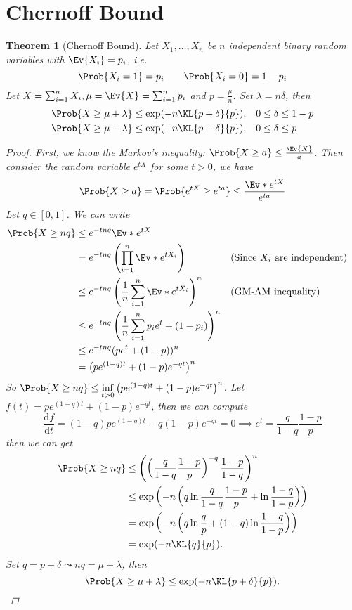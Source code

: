 \documentclass[a4paper]{article}
\theoremstyle{mystyle}
\newtheorem{theorem}{Theorem}
\begin{document}
\section{Chernoff Bound}
\begin{theorem}[Chernoff Bound]
  Let $X_1, \dots, X_n$ be $n$ independent binary random variables with
  $\Ev{X_i} = p_i$, i.e.
  \[
      \Prob{X_i = 1} = p_i \qquad \Prob{X_i = 0} = 1 - p_i
  \]
  Let $X = \sum_{i=1}^n X_i, \mu = \Ev{X} = \sum_{i=1}^n p_i$ and $p = \frac{\mu}{n}$.
  Set $\lambda = n\delta$, then
  \begin{align*}
    \Prob{ X \ge \mu + \lambda } \le \exp(-n \KL{p+\delta}{p}), & \quad
    0 \le \delta \le 1 - p \\
    \Prob{ X \ge \mu - \lambda } \le \exp(-n \KL{p-\delta}{p}), & \quad
    0 \le \delta \le p
  \end{align*}

  \begin{proof}
    First, we know the Markov's inequality: $\Prob{X \ge a} \le \frac{\Ev{X}}{a}$.
    Then consider the random variable $e^{tX}$ for some $t > 0$, we have
    \[
      \Prob{X \ge a} = \Prob{e^{tX} \ge e^{ta}} \le \frac{\Ev*{e^{tX}}}{e^{ta}}
    \]
    Let $q \in [0, 1]$. We can write
    \begin{align*}
      \Prob{X \ge nq} &\le e^{-tnq} \Ev*{e^{tX}} \\
                     &= e^{-tnq} \left( \prod_{i=1}^n \Ev*{e^{tX_i}} \right)
                     && \text{(Since $X_i$ are independent)}\\
                     &\le e^{-tnq} \left(\frac{1}{n} \sum_{i=1}^n \Ev*{e^{tX_i}} \right)^n
                     && \text{(GM-AM inequality)}\\
                     &\le e^{-tnq} \left(\frac{1}{n} \sum_{i=1}^n p_i e^t + (1 - p_i) \right)^n \\
                     &\le e^{-tnq} (p e^t + (1 - p))^n \\
                     &= \big(p e^{(1-q)t} + (1-p)e^{-qt}\big)^n
    \end{align*}
    So $\Prob{X \ge nq} \le \inf\limits_{t > 0} \big(p e^{(1-q)t} + (1-p)e^{-qt}\big)^n$.
    Let $f(t) = p e^{(1-q)t} + (1-p)e^{-qt}$, then we can compute
    \[
      \frac{\mathrm{d} f}{\mathrm{d} t}
      = (1-q)p e^{(1-q)t} - q(1-p)e^{-qt} = 0
      \implies 
      e^t = \frac{q}{1-q}\frac{1-p}{p}
    \]
    then we can get
    \begin{align*}
      \Prob{X \ge nq}
      &\le \left(\left(\frac{q}{1-q}\frac{1-p}{p} \right)^{-q} \frac{1-p}{1-q}\right)^n \\
      &\le \exp \left( -n \left( q \ln \frac{q}{1-q}\frac{1-p}{p} + \ln \frac{1-q}{1-p} \right)\right)\\
      &= \exp \left( -n \left( q \ln \frac{q}{p} + (1-q) \ln \frac{1-q}{1-p} \right)\right)\\
      &= \exp(-n \KL{q}{p}).
    \end{align*}
    Set $q = p + \delta \leadsto nq = \mu + \lambda$, then
    \[
      \Prob{X \ge \mu + \lambda} \le \exp(-n \KL{p+\delta}{p}).  \qedhere
    \]
  \end{proof}
\end{theorem}
\end{document}
